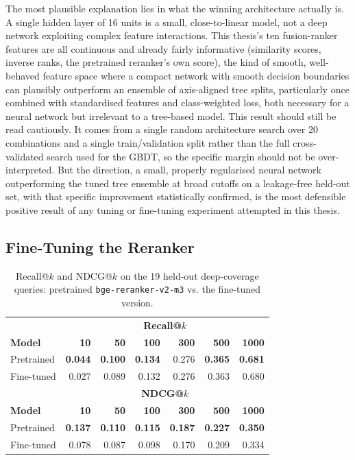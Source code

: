 \documentclass[a4paper,oneside,bibliography=totoc]{scrbook}
\begin{document}
The most plausible explanation lies in what the winning architecture actually is. A single hidden layer of 16 units is a small, close-to-linear model, not a deep network exploiting complex feature interactions. This thesis's ten fusion-ranker features are all continuous and already fairly informative (similarity scores, inverse ranks, the pretrained reranker's own score), the kind of smooth, well-behaved feature space where a compact network with smooth decision boundaries can plausibly outperform an ensemble of axis-aligned tree splits, particularly once combined with standardised features and class-weighted loss, both necessary for a neural network but irrelevant to a tree-based model. This result should still be read cautiously. It comes from a single random architecture search over 20 combinations and a single train/validation split rather than the full cross-validated search used for the GBDT, so the specific margin should not be over-interpreted. But the direction, a small, properly regularised neural network outperforming the tuned tree ensemble at broad cutoffs on a leakage-free held-out set, with that specific improvement statistically confirmed, is the most defensible positive result of any tuning or fine-tuning experiment attempted in this thesis.

\subsection{Fine-Tuning the Reranker}
\label{subsec:reranker_finetuning_result}

\begin{table}[ht]
\centering
\caption{Recall@$k$ and NDCG@$k$ on the 19 held-out deep-coverage queries: pretrained \texttt{bge-reranker-v2-m3} vs. the fine-tuned version.}
\label{tab:reranker_finetuning}
\begin{tabular}{lrrrrrr}
\toprule
& \multicolumn{6}{c}{\textbf{Recall@$k$}} \\
\textbf{Model} & \textbf{10} & \textbf{50} & \textbf{100} & \textbf{300} & \textbf{500} & \textbf{1000} \\
\midrule
Pretrained & \textbf{0.044} & \textbf{0.100} & \textbf{0.134} & 0.276 & \textbf{0.365} & \textbf{0.681} \\
Fine-tuned & 0.027 & 0.089 & 0.132 & 0.276 & 0.363 & 0.680 \\
\midrule
& \multicolumn{6}{c}{\textbf{NDCG@$k$}} \\
\textbf{Model} & \textbf{10} & \textbf{50} & \textbf{100} & \textbf{300} & \textbf{500} & \textbf{1000} \\
\midrule
Pretrained & \textbf{0.137} & \textbf{0.110} & \textbf{0.115} & \textbf{0.187} & \textbf{0.227} & \textbf{0.350} \\
Fine-tuned & 0.078 & 0.087 & 0.098 & 0.170 & 0.209 & 0.334 \\
\bottomrule
\end{tabular}
\end{table}
\end{document}
